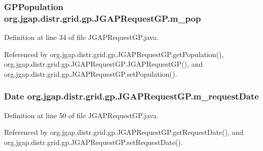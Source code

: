 \hypertarget{classorg_1_1jgap_1_1distr_1_1grid_1_1gp_1_1_j_g_a_p_request_g_p_ab224bd8c2ec67ac51a952099b410dccc}{
\subsubsection[{m\-\_\-pop}]{\setlength{\rightskip}{0pt plus 5cm}G\-P\-Population org.\-jgap.\-distr.\-grid.\-gp.\-J\-G\-A\-P\-Request\-G\-P.\-m\-\_\-pop\hspace{0.3cm}{\ttfamily [private]}}}\label{classorg_1_1jgap_1_1distr_1_1grid_1_1gp_1_1_j_g_a_p_request_g_p_ab224bd8c2ec67ac51a952099b410dccc}


Definition at line 34 of file J\-G\-A\-P\-Request\-G\-P.\-java.



Referenced by org.\-jgap.\-distr.\-grid.\-gp.\-J\-G\-A\-P\-Request\-G\-P.\-get\-Population(), org.\-jgap.\-distr.\-grid.\-gp.\-J\-G\-A\-P\-Request\-G\-P.\-J\-G\-A\-P\-Request\-G\-P(), and org.\-jgap.\-distr.\-grid.\-gp.\-J\-G\-A\-P\-Request\-G\-P.\-set\-Population().

\hypertarget{classorg_1_1jgap_1_1distr_1_1grid_1_1gp_1_1_j_g_a_p_request_g_p_a35c3e293e95525b2666660c87dbd1edb}{
\subsubsection[{m\-\_\-request\-Date}]{\setlength{\rightskip}{0pt plus 5cm}Date org.\-jgap.\-distr.\-grid.\-gp.\-J\-G\-A\-P\-Request\-G\-P.\-m\-\_\-request\-Date\hspace{0.3cm}{\ttfamily [private]}}}\label{classorg_1_1jgap_1_1distr_1_1grid_1_1gp_1_1_j_g_a_p_request_g_p_a35c3e293e95525b2666660c87dbd1edb}


Definition at line 50 of file J\-G\-A\-P\-Request\-G\-P.\-java.



Referenced by org.\-jgap.\-distr.\-grid.\-gp.\-J\-G\-A\-P\-Request\-G\-P.\-get\-Request\-Date(), and org.\-jgap.\-distr.\-grid.\-gp.\-J\-G\-A\-P\-Request\-G\-P.\-set\-Request\-Date().

